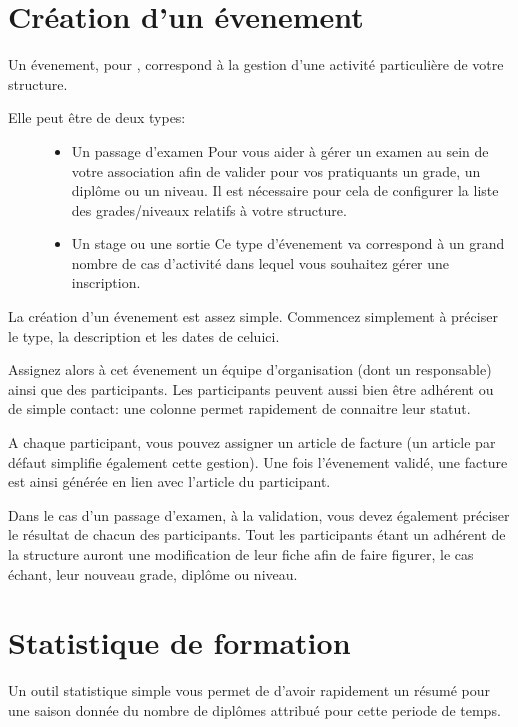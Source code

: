 \documentclass[a4paper,10pt,oneside,french]{sphinxmanual}
\begin{document}
\section{Création d’un évenement}
\label{\detokenize{event/newevent:creation-d-un-evenement}}\label{\detokenize{event/newevent::doc}}
Un évenement, pour , correspond à la gestion d’une activité particulière de votre structure.
\begin{description}
\item[{Elle peut être de deux types:}] \leavevmode\begin{itemize}
\item {} 
Un passage d’examen
Pour vous aider à gérer un examen au sein de votre association afin de valider pour vos pratiquants un grade, un diplôme ou un niveau.
Il est nécessaire pour cela de configurer la liste des grades/niveaux relatifs à votre structure.

\item {} 
Un stage ou une sortie
Ce type d’évenement va correspond à un grand nombre de cas d’activité dans lequel vous souhaitez gérer une inscription.

\end{itemize}

\end{description}

La création d’un évenement est assez simple.
Commencez simplement à préciser le type, la description et les dates de celui\sphinxhyphen{}ci.

Assignez alors à cet évenement un équipe d’organisation (dont un responsable) ainsi que des participants.
Les participants peuvent aussi bien être adhérent ou de simple contact: une colonne permet rapidement de connaitre leur statut.

A chaque participant, vous pouvez assigner un article de facture (un article par défaut simplifie également cette gestion).
Une fois l’évenement validé, une facture est ainsi générée en lien avec l’article du participant.

Dans le cas d’un passage d’examen, à la validation, vous devez également préciser le résultat de chacun des participants.
Tout les participants étant un adhérent de la structure auront une modification de leur fiche afin de faire figurer, le cas échant, leur nouveau grade, diplôme ou niveau.


\section{Statistique de formation}
\label{\detokenize{event/statistic:statistique-de-formation}}\label{\detokenize{event/statistic::doc}}
Un outil statistique simple vous permet de d’avoir rapidement un résumé pour une saison donnée du nombre de diplômes attribué pour cette periode de temps.
\end{document}
